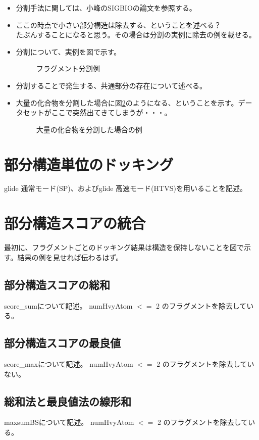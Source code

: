 \begin{itemize}
\item 分割手法に関しては、小峰のSIGBIOの論文を参照する。\citetodo{}
\item ここの時点で小さい部分構造は除去する、ということを述べる？\\
たぶんすることになると思う。その場合は分割の実例に除去の例を載せる。
\item 分割について、実例を図で示す。

\begin{figure}[htp]
 \begin{center}
  \caption{フラグメント分割例}
  \label{fig:ex_decomposition}
 \end{center}
\end{figure}

\item 分割することで発生する、共通部分の存在について述べる。
\item 大量の化合物を分割した場合に図\ref{fig:decomposition_amount}のようになる、ということを示す。データセットがここで突然出てきてしまうが・・・。

\begin{figure}[htp]
 \begin{center}
  \caption{大量の化合物を分割した場合の例}
  \label{fig:decomposition_amount}
 \end{center}
\end{figure}

\end{itemize}

\section{部分構造単位のドッキング}
glide 通常モード(SP)、およびglide 高速モード(HTVS)を用いることを記述。

\section{部分構造スコアの統合}
最初に、フラグメントごとのドッキング結果は構造を保持しないことを図で示す。結果の例を見せれば伝わるはず。
\subsection{部分構造スコアの総和}
score\_sumについて記述。
numHvyAtom $<=$ 2 のフラグメントを除去している。
\subsection{部分構造スコアの最良値}
score\_maxについて記述。
numHvyAtom $<=$ 2 のフラグメントを除去していない。
\subsection{総和法と最良値法の線形和}
maxsumBSについて記述。
numHvyAtom $<=$ 2 のフラグメントを除去している。
